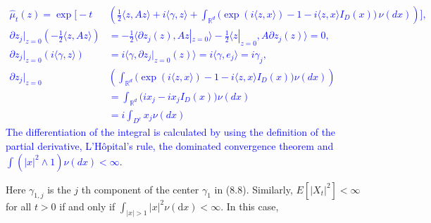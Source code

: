 \documentclass[a4paper,11pt]{article}
\begin{document}
\textcolor{blue}{
\small
\begin{align*}
    \widehat{\mu}_{t}(z)                                                      =
    \operatorname{e x p} \biggl[-t                                           & \left(\frac{1} {2} \langle z, A z \rangle +i \langle\gamma, z \rangle+\int_{\mathbb{R}^{d}} \bigl( \operatorname{e x p} ( i \langle z, x \rangle)-1-i \langle z, x \rangle I_{D} ( x ) \bigr) \, \nu( d x )\right) \biggr], \\
    \partial z_{j}|_{z=0}\left( -\frac{1} {2} \langle z, A z \rangle \right) & =
    -\frac{1} {2} \langle \partial z_{j}(z), A z|_{z=0} \rangle
    -\frac{1} {2} \langle z|_{z=0}, A \partial z_{j}(z) \rangle=0,                                                                                                                                                                                                                                         \\
    \partial z_{j}|_{z=0}\left( i \langle \gamma, z \rangle \right)          & = i \langle\gamma, \partial z_{j}|_{z=0}(z) \rangle =
    i \langle\gamma, e_{j}  \rangle = i \gamma_{j}                           ,                                                                                                                                                                                                                             \\
    \partial z_{j}|_{z=0}                                                    & \left( \int_{\mathbb{R}^{d}}                         \bigl( \operatorname{e x p} ( i \langle z, x \rangle)-1-i \langle z, x \rangle I_{D} ( x ) \bigr) \nu(dx) \right)                                                      \\
                                                                             & = \int_{\mathbb{R}^{d}}                         \bigl( ix_{j}-i x_{j}I_{D} ( x ) \bigr) \nu(dx)                                                                                                                             \\
                                                                             & = i\int_{D^{c}} x_{j} \nu(dx)
\end{align*}
The differentiation of the integral is calculated by using the definition of the partial derivative, L'H\^{o}pital's rule, the dominated convergence theorem and $\int(|x|^{2} \wedge 1 ) \nu(dx) < \infty $.
}

Here $\gamma_{1, j}$ is the $j$ th
component of the center $\gamma_{1}$ in (8.8). Similarly, $E\left[\left|X_{t}\right|^{2}\right]<\infty$
for all $t>0$ if and only if $\int_{|x|>1}|x|^{2} \nu(\mathrm{d} x)<\infty$. In this case,
\end{document}
